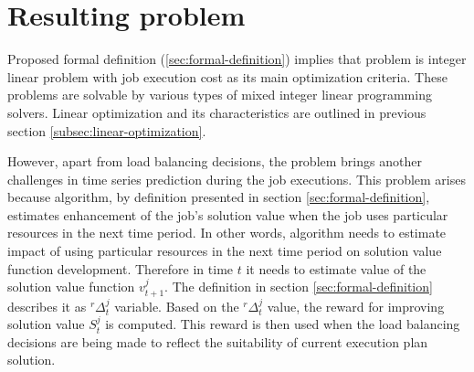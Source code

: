 \newpage
\section{Resulting problem}\label{sec:resulting-problem}
Proposed formal definition (\ref{sec:formal-definition}) implies that problem is 
integer linear problem with job execution cost as its main optimization criteria. 
These problems are solvable by various types of mixed integer linear programming solvers.
Linear optimization and its characteristics are outlined in previous section \ref{subsec:linear-optimization}.

However,
apart from load balancing decisions,
the problem brings another challenges in time series prediction during the job executions.
This problem arises because algorithm, by definition presented in section \ref{sec:formal-definition},
estimates enhancement of the job's solution value when the job uses particular resources in the next time period.
In other words, 
algorithm needs to estimate impact of using particular resources in the next time period on solution value function development.
Therefore in time $t$ it needs to estimate value of the solution value function $v_{t+1}^{j}$.
The definition in section \ref{sec:formal-definition} describes it as $^{r}\Delta_{t}^{j}$ variable.
Based on the $^{r}\Delta_{t}^{j}$ value, the reward for improving solution value $S_{t}^{j}$ is computed.
This reward is then used when the load balancing decisions are being made to reflect the suitability of current execution plan solution.